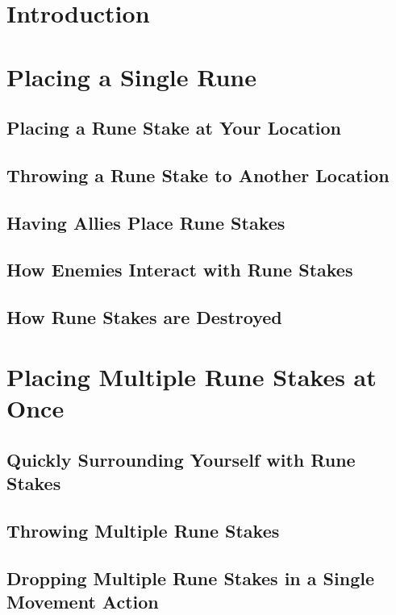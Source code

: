 \section{Introduction}

\section{Placing a Single Rune}

\subsection{Placing a Rune Stake at Your Location}

\subsection{Throwing a Rune Stake to Another Location}

\subsection{Having Allies Place Rune Stakes}

\subsection{How Enemies Interact with Rune Stakes}

\subsection{How Rune Stakes are Destroyed}

\section{Placing Multiple Rune Stakes at Once}

\subsection{Quickly Surrounding Yourself with Rune Stakes}

\subsection{Throwing Multiple Rune Stakes}

\subsection{Dropping Multiple Rune Stakes in a Single Movement Action}

